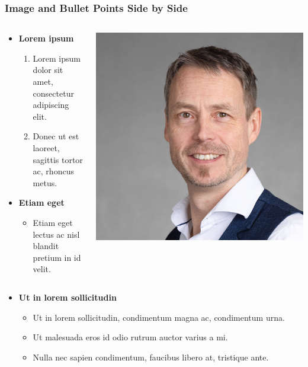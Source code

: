 \documentclass[english,hangout]{FrankfurtUAS}
\begin{document}
\begin{frame}
\frametitle{Image and Bullet Points Side by Side}
\begin{columns}[onlytextwidth]
\begin{column}{.7\textwidth}
\begin{itemize}
\item \textbf{Lorem ipsum} 
\begin{enumerate}
\item Lorem ipsum dolor sit amet, consectetur adipiscing elit.
\item Donec ut est laoreet, sagittis tortor ac, rhoncus metus.
\end{enumerate}
\item \textbf{Etiam eget} 
\begin{itemize}
\item Etiam eget lectus ac nisl blandit pretium in id velit.
\end{itemize}
\end{itemize}
\end{column}

\begin{column}{.3\textwidth}
\includegraphics[width=\textwidth]{me}
\end{column}
\end{columns}

\vspace{-1.em}
\begin{itemize}
\item \textbf{Ut in lorem sollicitudin}
\begin{itemize}
\item Ut in lorem sollicitudin, condimentum magna ac, condimentum urna.
\item Ut malesuada eros id odio rutrum auctor varius a mi.
\item Nulla nec sapien condimentum, faucibus libero at, tristique ante.
\end{itemize}
\end{itemize}
\end{frame}
\end{document}
